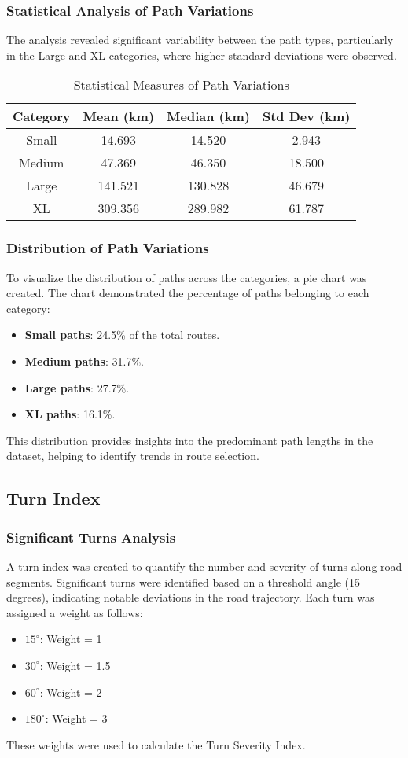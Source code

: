 \documentclass[sigplan,screen]{acmart}
\begin{document}
\subsubsection{Statistical Analysis of Path Variations}
The analysis revealed significant variability between the path types, particularly in the Large and XL categories, where higher standard deviations were observed.

\begin{table}[h!]
\centering
\begin{tabular}{|c|c|c|c|}
\hline
\textbf{Category} & \textbf{Mean (km)} & \textbf{Median (km)} & \textbf{Std Dev (km)} \\
\hline
Small & 14.693 & 14.520 & 2.943 \\
Medium & 47.369 & 46.350 & 18.500 \\
Large & 141.521 & 130.828 & 46.679 \\
XL & 309.356 & 289.982 & 61.787 \\
\hline
\end{tabular}
\caption{Statistical Measures of Path Variations}
\end{table}

\subsubsection{Distribution of Path Variations}
To visualize the distribution of paths across the categories, a pie chart was created. The chart demonstrated the percentage of paths belonging to each category:
\begin{itemize}
    \item \textbf{Small paths}: 24.5\% of the total routes.
    \item \textbf{Medium paths}: 31.7\%.
    \item \textbf{Large paths}: 27.7\%.
    \item \textbf{XL paths}: 16.1\%.
\end{itemize}
This distribution provides insights into the predominant path lengths in the dataset, helping to identify trends in route selection.

\subsection{Turn Index}
\subsubsection{Significant Turns Analysis}
A turn index was created to quantify the number and severity of turns along road segments. Significant turns were identified based on a threshold angle (15 degrees), indicating notable deviations in the road trajectory. Each turn was assigned a weight as follows:
\begin{itemize}
    \item $15^\circ$: Weight = 1
    \item  $30^\circ$: Weight = 1.5
    \item  $60^\circ$: Weight = 2
    \item  $180^\circ$: Weight = 3
\end{itemize}
These weights were used to calculate the Turn Severity Index.
\end{document}
